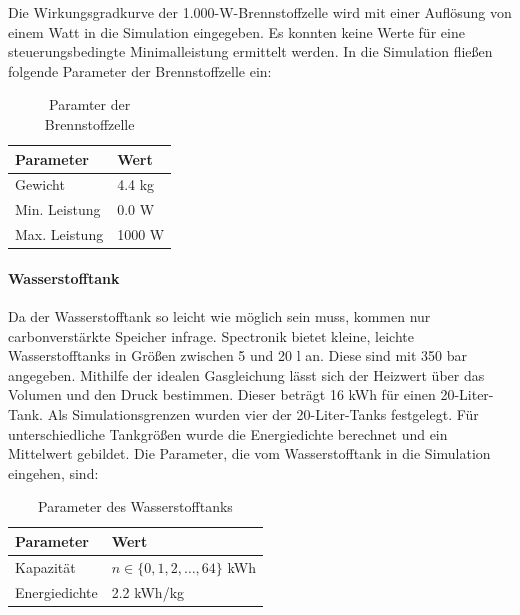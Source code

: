 Die Wirkungsgradkurve der 1.000-W-Brennstoffzelle wird mit einer Auflösung von einem Watt in die Simulation eingegeben. Es konnten keine Werte für eine steuerungsbedingte Minimalleistung ermittelt werden. In die Simulation fließen folgende Parameter der Brennstoffzelle ein: 

\begin{table}[h]
\centering
\begin{tabular}{|l|l|}
\hline
\textbf{Parameter} & \textbf{Wert} \\ \hline
Gewicht & 4.4 kg \\ \hline
Min. Leistung & 0.0 W \\ \hline
Max. Leistung & 1000 W \\ \hline
\end{tabular}
\caption{Paramter der Brennstoffzelle \cite{FC-katalog}}
\end{table}

\paragraph{Wasserstofftank}
Da der Wasserstofftank so leicht wie möglich sein muss, kommen nur carbonverstärkte Speicher infrage. Spectronik bietet kleine, leichte Wasserstofftanks in Größen zwischen 5 und 20 l an. Diese sind mit 350 bar angegeben. Mithilfe der idealen Gasgleichung lässt sich der Heizwert über das Volumen und den Druck bestimmen. Dieser beträgt 16 kWh für einen 20-Liter-Tank. Als Simulationsgrenzen wurden vier der 20-Liter-Tanks festgelegt. Für unterschiedliche Tankgrößen wurde die Energiedichte berechnet und ein Mittelwert gebildet. Die Parameter, die vom Wasserstofftank in die Simulation eingehen, sind: 

\begin{table}[h]
\centering
\begin{tabular}{|l|l|}
\hline
\textbf{Parameter} & \textbf{Wert} \\ \hline
Kapazität & $ n \in \{0,1,2,\dots,64\}$ kWh \\ \hline
Energiedichte & 2.2 kWh/kg \\ \hline
\end{tabular}
\caption{Parameter des Wasserstofftanks \cite{TankH2}}
\end{table}

